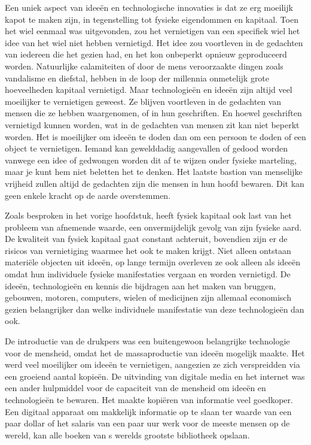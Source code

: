 Een uniek aspect van ideeën en technologische innovaties is dat ze erg moeilijk kapot te maken zijn, in tegenstelling tot fysieke eigendommen en kapitaal. Toen het wiel eenmaal was uitgevonden, zou het vernietigen van een specifiek wiel het idee van het wiel niet hebben vernietigd. Het idee zou voortleven in de gedachten van iedereen die het gezien had, en het kon onbeperkt opnieuw geproduceerd worden. Natuurlijke calamiteiten of door de mens veroorzaakte dingen zoals vandalisme en diefstal, hebben in de loop der millennia onmetelijk grote hoeveelheden kapitaal vernietigd. Maar technologieën en ideeën zijn altijd veel moeilijker te vernietigen geweest. Ze blijven voortleven in de gedachten van mensen die ze hebben waargenomen, of in hun geschriften. En hoewel geschriften vernietigd kunnen worden, wat in de gedachten van mensen zit kan niet beperkt worden. Het is moeilijker om ideeën te doden dan om een persoon te doden of een object te vernietigen. Iemand kan gewelddadig aangevallen of gedood worden vanwege een idee of gedwongen worden dit af te wijzen onder fysieke marteling, maar je kunt hem niet beletten het te denken. Het laatste bastion van menselijke vrijheid zullen altijd de gedachten zijn die mensen in hun hoofd bewaren. Dit kan geen enkele kracht op de aarde overstemmen.

Zoals besproken in het vorige hoofdstuk, heeft fysiek kapitaal ook last van het probleem van afnemende waarde, een onvermijdelijk gevolg van zijn fysieke aard. De kwaliteit van fysiek kapitaal gaat constant achteruit, bovendien zijn er de risico\textquotesingle s van vernietiging waarmee het ook te maken krijgt. Niet alleen ontstaan materiële objecten uit ideeën, op lange termijn overleven ze ook alleen als ideeën omdat hun individuele fysieke manifestaties vergaan en worden vernietigd. De ideeën, technologieën en kennis die bijdragen aan het maken van bruggen, gebouwen, motoren, computers, wielen of medicijnen zijn allemaal economisch gezien belangrijker dan welke individuele manifestatie van deze technologieën dan ook.

De introductie van de drukpers was een buitengewoon belangrijke technologie voor de mensheid, omdat het de massaproductie van ideeën mogelijk maakte. Het werd veel moeilijker om ideeën te vernietigen, aangezien ze zich verspreidden via een groeiend aantal kopieën. De uitvinding van digitale media en het internet was een ander hulpmiddel voor de capaciteit van de mensheid om ideeën en technologieën te bewaren. Het maakte kopiëren van informatie veel goedkoper. Een digitaal apparaat om makkelijk informatie op te slaan ter waarde van een paar dollar of het salaris van een paar uur werk voor de meeste mensen op de wereld, kan alle boeken van \textquotesingle s werelds grootste bibliotheek opslaan.


